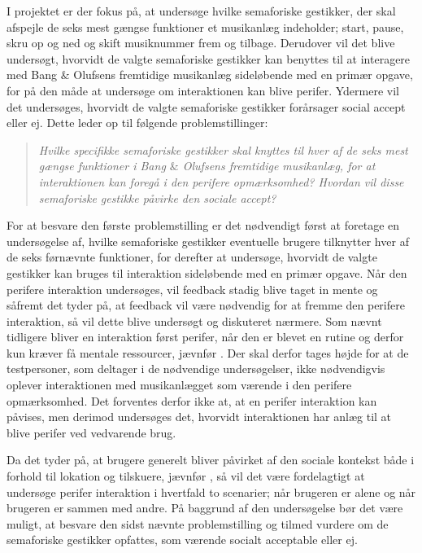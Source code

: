 

I projektet er der fokus på, at undersøge hvilke semaforiske gestikker, der skal afspejle de seks mest gængse funktioner et musikanlæg indeholder; start, pause, skru op og ned og skift musiknummer frem og tilbage. Derudover vil det blive undersøgt, hvorvidt de valgte semaforiske gestikker kan benyttes til at interagere med Bang $\&$ Olufsens fremtidige musikanlæg sideløbende med en primær opgave, for på den måde at undersøge om interaktionen kan blive perifer. Ydermere vil det undersøges, hvorvidt de valgte semaforiske gestikker forårsager social accept eller ej. Dette leder op til følgende problemstillinger:\blankline
%
\begin{quotation}
	\noindent
	\textit{Hvilke specifikke semaforiske gestikker skal knyttes til hver af de seks mest gængse funktioner i Bang $\&$ Olufsens fremtidige musikanlæg, for at interaktionen kan foregå i den perifere opmærksomhed?\blankline
		Hvordan vil disse semaforiske gestikke påvirke den sociale accept?}\blankline
\end{quotation}
%
For at besvare den første problemstilling er det nødvendigt først at foretage en undersøgelse af, hvilke semaforiske gestikker eventuelle brugere tilknytter hver af de seks førnævnte funktioner, for derefter at undersøge, hvorvidt de valgte gestikker kan bruges til interaktion sideløbende med en primær opgave. Når den perifere interaktion undersøges, vil feedback stadig blive taget in mente og såfremt det tyder på, at feedback vil være nødvendig for at fremme den perifere interaktion, så vil dette blive undersøgt og diskuteret nærmere. Som nævnt tidligere bliver en interaktion først perifer, når den er blevet en rutine og derfor kun kræver få mentale ressourcer, jævnfør . Der skal derfor tages højde for at de testpersoner, som deltager i de nødvendige undersøgelser, ikke nødvendigvis oplever interaktionen med musikanlægget som værende i den perifere opmærksomhed. Det forventes derfor ikke at, at en perifer interaktion kan påvises, men derimod undersøges det, hvorvidt interaktionen har anlæg til at blive perifer ved vedvarende brug. 

Da det tyder på, at brugere generelt bliver påvirket af den sociale kontekst både i forhold til lokation og tilskuere, jævnfør , så vil det være fordelagtigt at undersøge perifer interaktion i hvertfald to scenarier; når brugeren er alene og når brugeren er sammen med andre. På baggrund af den undersøgelse bør det være muligt, at besvare den sidst nævnte problemstilling og tilmed vurdere om de semaforiske gestikker opfattes, som værende socialt acceptable eller ej. 




